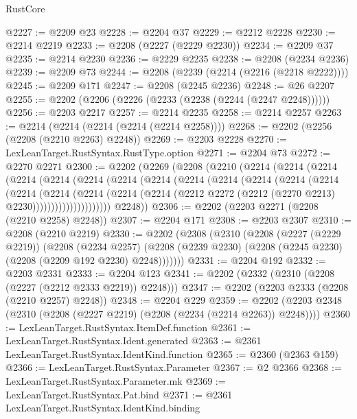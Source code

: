 \begin{lexlean}{RustCore}
\begin{coremodule}
@2227 := @2209 @23
@2228 := @2204 @37
@2229 := @2212 @2228
@2230 := @2214 @2219
@2233 := @2208 (@2227 (@2229 @2230))
@2234 := @2209 @37
@2235 := @2214 @2230
@2236 := @2229 @2235
@2238 := @2208 (@2234 @2236)
@2239 := @2209 @73
@2244 := @2208 (@2239 (@2214 (@2216 (@2218 @2222))))
@2245 := @2209 @171
@2247 := @2208 (@2245 @2236)
@2248 := @26 @2207
@2255 := @2202 (@2206 (@2226 (@2233 (@2238 (@2244 (@2247 @2248))))))
@2256 := @2203 @2217
@2257 := @2214 @2235
@2258 := @2214 @2257
@2263 := @2214 (@2214 (@2214 (@2214 (@2214 @2258))))
@2268 := @2202 (@2256 (@2208 (@2210 @2263) @2248))
@2269 := @2203 @2228
@2270 := LexLeanTarget.RustSyntax.RustType.option
@2271 := @2204 @73
@2272 := @2270 @2271
@2300 := @2202
    (@2269
      (@2208
        (@2210
          (@2214
            (@2214
              (@2214
                (@2214
                  (@2214
                    (@2214
                      (@2214
                        (@2214
                          (@2214
                            (@2214
                              (@2214
                                (@2214
                                  (@2214
                                    (@2214
                                      (@2214
                                        (@2214
                                          (@2214
                                            (@2214
                                              (@2212
                                                @2272
                                                (@2212 (@2270 @2213) @2230)))))))))))))))))))))
        @2248))
@2306 := @2202 (@2203 @2271 (@2208 (@2210 @2258) @2248))
@2307 := @2204 @171
@2308 := @2203 @2307
@2310 := @2208 (@2210 @2219)
@2330 := @2202
    (@2308
      (@2310
        (@2208
          (@2227 (@2229 @2219))
          (@2208
            (@2234 @2257)
            (@2208 (@2239 @2230) (@2208 (@2245 @2230) (@2208 (@2209 @192 @2230) @2248)))))))
@2331 := @2204 @192
@2332 := @2203 @2331
@2333 := @2204 @123
@2341 := @2202 (@2332 (@2310 (@2208 (@2227 (@2212 @2333 @2219)) @2248)))
@2347 := @2202 (@2203 @2333 (@2208 (@2210 @2257) @2248))
@2348 := @2204 @229
@2359 := @2202 (@2203 @2348 (@2310 (@2208 (@2227 @2219) (@2208 (@2234 (@2214 @2263)) @2248))))
@2360 := LexLeanTarget.RustSyntax.ItemDef.function
@2361 := LexLeanTarget.RustSyntax.Ident.generated
@2363 := @2361 LexLeanTarget.RustSyntax.IdentKind.function
@2365 := @2360 (@2363 @159)
@2366 := LexLeanTarget.RustSyntax.Parameter
@2367 := @2 @2366
@2368 := LexLeanTarget.RustSyntax.Parameter.mk
@2369 := LexLeanTarget.RustSyntax.Pat.bind
@2371 := @2361 LexLeanTarget.RustSyntax.IdentKind.binding

\end{coremodule}
\end{lexlean}
